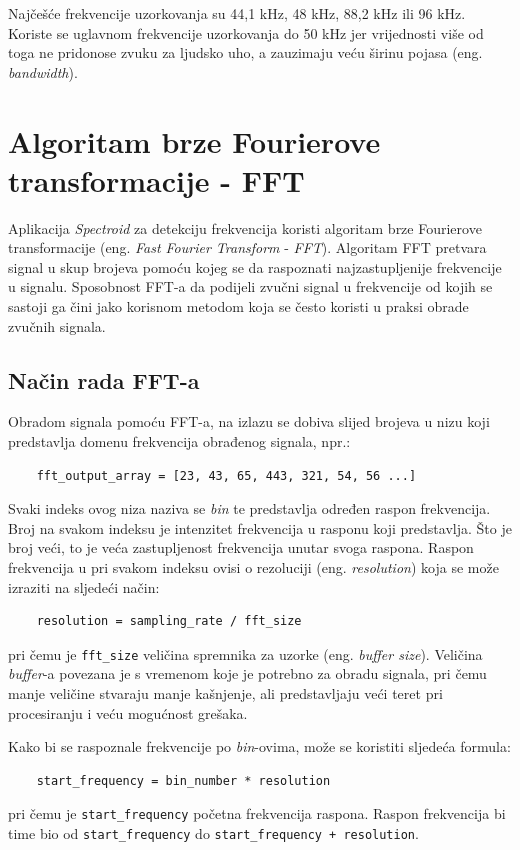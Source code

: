\documentclass[times, utf8, zavrsni, numeric]{fer}
\begin{document}
Najčešće frekvencije uzorkovanja su 44,1 kHz, 48 kHz, 88,2 kHz ili 96 kHz.\cite{self2012audio} Koriste se uglavnom frekvencije uzorkovanja do 50 kHz jer vrijednosti više od toga ne pridonose zvuku za ljudsko uho, a zauzimaju veću širinu pojasa (eng. \textit{bandwidth}).

\chapter{Algoritam brze Fourierove transformacije - FFT}
Aplikacija \textit{Spectroid} za detekciju frekvencija koristi algoritam brze Fourierove transformacije (eng. \textit{Fast Fourier Transform} - \textit{FFT}).\cite{reinke_2018} Algoritam FFT pretvara signal u skup brojeva pomoću kojeg se da raspoznati najzastupljenije frekvencije u signalu. Sposobnost FFT-a da podijeli zvučni signal u frekvencije od kojih se sastoji ga čini jako korisnom metodom koja se često koristi u praksi obrade zvučnih signala.\cite{gustine_2021}

\section{Način rada FFT-a}
Obradom signala pomoću FFT-a, na izlazu se dobiva slijed brojeva u nizu koji predstavlja domenu frekvencija obrađenog signala, npr.:
\begin{verbatim}
	fft_output_array = [23, 43, 65, 443, 321, 54, 56 ...]
\end{verbatim}
Svaki indeks ovog niza naziva se \textit{bin} te predstavlja određen raspon frekvencija. Broj na svakom indeksu je intenzitet frekvencija u rasponu koji predstavlja. Što je broj veći, to je veća zastupljenost frekvencija unutar svoga raspona. Raspon frekvencija u pri svakom indeksu ovisi o rezoluciji (eng. \textit{resolution}) koja se može izraziti na sljedeći način:
\begin{verbatim}
	resolution = sampling_rate / fft_size
\end{verbatim}
pri čemu je \verb|fft_size| veličina spremnika za uzorke (eng. \textit{buffer size}).\cite{lourde2009digital} Veličina \textit{buffer}-a povezana je s vremenom koje je potrebno za obradu signala, pri čemu manje veličine stvaraju manje kašnjenje, ali predstavljaju veći teret pri procesiranju i veću mogućnost grešaka.\cite{focusrite_2022}

Kako bi se raspoznale frekvencije po \textit{bin}-ovima, može se koristiti sljedeća formula:
\begin{verbatim}
	start_frequency = bin_number * resolution
\end{verbatim}
pri čemu je \verb|start_frequency| početna frekvencija raspona.\cite{gustine_2021} Raspon frekvencija bi time bio od \verb|start_frequency| do \verb|start_frequency + resolution|.
\end{document}

